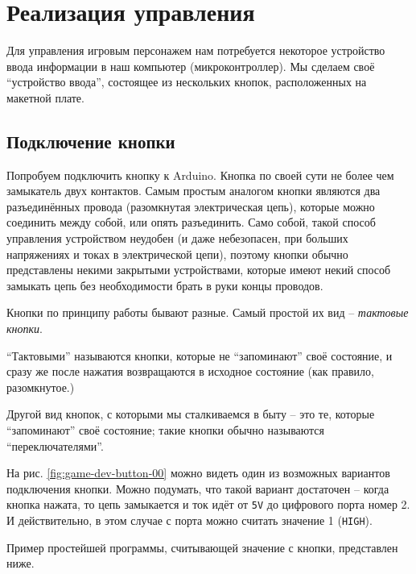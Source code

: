 \documentclass[../sparc.tex]{subfiles}
\begin{document}
\section{Реализация управления}
\label{section:game-dev-controls}

Для управления игровым персонажем нам потребуется некоторое устройство ввода
информации в наш компьютер (микроконтроллер).  Мы сделаем своё ``устройство
ввода'', состоящее из нескольких кнопок, расположенных на макетной плате.

\subsection{Подключение кнопки}

Попробуем подключить кнопку к Arduino.  Кнопка по своей сути не более чем
замыкатель двух контактов.  Самым простым аналогом кнопки являются два
разъединённых провода (разомкнутая электрическая цепь), которые можно соединить
между собой, или опять разъединить.  Само собой, такой способ управления
устройством неудобен (и даже небезопасен, при больших напряжениях и токах в
электрической цепи), поэтому кнопки обычно представлены некими закрытыми
устройствами, которые имеют некий способ замыкать цепь без необходимости брать в
руки концы проводов.

Кнопки по принципу работы бывают разные.  Самый простой их вид -- \emph{тактовые
кнопки}.

``Тактовыми'' называются кнопки, которые не ``запоминают'' своё состояние, и
сразу же после нажатия возвращаются в исходное состояние (как правило,
разомкнутое.)

Другой вид кнопок, с которыми мы сталкиваемся в быту -- это те, которые
``запоминают'' своё состояние; такие кнопки обычно называются
``переключателями''.

На рис. \ref{fig:game-dev-button-00} можно видеть один из возможных вариантов
подключения кнопки.  Можно подумать, что такой вариант достаточен -- когда кнопка
нажата, то цепь замыкается и ток идёт от \texttt{5V} до цифрового порта номер 2.
И действительно, в этом случае с порта можно считать значение 1 (\texttt{HIGH}).


Пример простейшей программы, считывающей значение с кнопки, представлен ниже.
\end{document}
